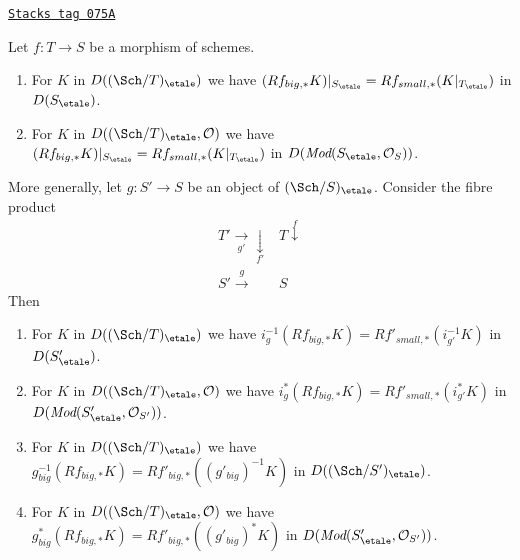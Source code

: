 \begin{lemma}
\label{etale-cohomology-lemma-compare-higher-direct-image}
\href{https://stacks.math.columbia.edu/tag/075A}{\texttt{Stacks tag 075A}}

Let $f : T \to S$ be a morphism of schemes.
\begin{enumerate}
\item For $K$ in $D((\Sch/T)_\etale)$ we have
$
(Rf_{big, *}K)|_{S_\etale} = Rf_{small, *}(K|_{T_\etale})
$
in $D(S_\etale)$.
\item For $K$ in $D((\Sch/T)_\etale, \mathcal{O})$ we have
$
(Rf_{big, *}K)|_{S_\etale} = Rf_{small, *}(K|_{T_\etale})
$
in $D(\textit{Mod}(S_\etale, \mathcal{O}_S))$.
\end{enumerate}
More generally, let $g : S' \to S$ be an object of $(\Sch/S)_\etale$.
Consider the fibre product
$$
\begin{array}{cc}T' \underset{g'}{\longrightarrow}\underset{f'}{\downarrow} & T \overset{f}{\downarrow} \\ S' \overset{g}{\longrightarrow} & S\end{array}
$$
Then
\begin{enumerate}
\item[(3)] For $K$ in $D((\Sch/T)_\etale)$ we have
$i_g^{-1}(Rf_{big, *}K) = Rf'_{small, *}(i_{g'}^{-1}K)$
in $D(S'_\etale)$.
\item[(4)] For $K$ in $D((\Sch/T)_\etale, \mathcal{O})$ we have
$i_g^*(Rf_{big, *}K) = Rf'_{small, *}(i_{g'}^*K)$
in $D(\textit{Mod}(S'_\etale, \mathcal{O}_{S'}))$.
\item[(5)] For $K$ in $D((\Sch/T)_\etale)$ we have
$g_{big}^{-1}(Rf_{big, *}K) = Rf'_{big, *}((g'_{big})^{-1}K)$
in $D((\Sch/S')_\etale)$.
\item[(6)] For $K$ in $D((\Sch/T)_\etale, \mathcal{O})$ we have
$g_{big}^*(Rf_{big, *}K) = Rf'_{big, *}((g'_{big})^*K)$
in $D(\textit{Mod}(S'_\etale, \mathcal{O}_{S'}))$.
\end{enumerate}
\end{lemma}

